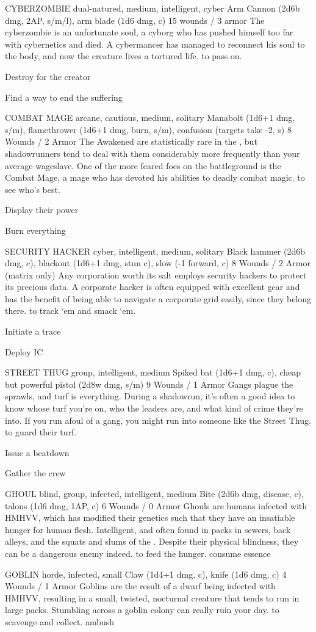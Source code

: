 \documentclass[oneside,10pt]{article}
\begin{document}
\begin{multicols}{2}
\critterspec
{CYBERZOMBIE	}
{dual-natured, medium, intelligent, cyber}
{Arm Cannon (2d6b dmg, 2AP, s/m/l), arm blade (1d6 dmg, c)}
{15 wounds / 3 armor}
{The cyberzombie is an unfortunate soul, a cyborg who has pushed himself too far with cybernetics and died. A cybermancer has managed to reconnect his soul to the body, and now the creature lives a tortured life. }
{to pass on.}
{\tcirc{} Destroy for the creator

\tcirc{} Find a way to end the suffering}


\critterspec
{COMBAT MAGE	}
{arcane, cautious, medium, solitary}
{Manabolt (1d6+1 dmg, s/m), flamethrower (1d6+1 dmg, burn, s/m), confusion (targets take -2, s)}
{8 Wounds / 2 Armor}
{The Awakened are statistically rare in the \SW{}, but shadowrunners tend to deal with them considerably more frequently than your average wageslave. One of the more feared foes on the battleground is the Combat Mage, a mage who has devoted his abilities to deadly combat magic.} 
{to see who’s best.}
{\tcirc{} Display their power

\tcirc{} Burn everything}

\critterspec
{SECURITY HACKER	}
{cyber, intelligent, medium, solitary}
{Black hammer (2d6b dmg, c), blackout (1d6+1 dmg, stun c), slow (-1 forward, c)}
{8 Wounds / 2 Armor (matrix only)}
{Any corporation worth its salt employs security hackers to protect its precious data. A corporate hacker is often equipped with excellent gear and has the benefit of being able to navigate a corporate grid easily, since they belong there.}
{to track ‘em and smack ‘em.}
{\tcirc{} Initiate a trace

\tcirc{} Deploy IC}

\critterspec
{STREET THUG}
{group, intelligent, medium}
{Spiked bat (1d6+1 dmg, c), cheap but powerful pistol (2d8w dmg, s/m)}
{9 Wounds / 1 Armor}
{Gangs plague the sprawls, and turf is everything. During a shadowrun, it’s often a good idea to know whose turf you’re on, who the leaders are, and what kind of crime they’re into. If you run afoul of a gang, you might run into someone like the Street Thug.}
{to guard their turf.}
{\tcirc{} Issue a beatdown

\tcirc{} Gather the crew
}

\critterspec
{GHOUL}
{blind, group, infected, intelligent, medium}
{Bite (2d6b dmg, disease, c), talons (1d6 dmg, 1AP, c)}
{6 Wounds / 0 Armor}
{Ghouls are humans infected with HMHVV, which has modified their genetics such that they have an insatiable hunger for human flesh. Intelligent, and often found in packs in sewers, back alleys, and the squats and slums of the \SW{}. Despite their physical blindness, they can be a dangerous enemy indeed.}
{to feed the hunger.}
{\tcirc{} consume essence}

\critterspec
{GOBLIN	}
{horde, infected, small}
{Claw (1d4+1 dmg, c), knife (1d6 dmg, c)}
{4 Wounds / 1 Armor}
{Goblins are the result of a dwarf being infected with HMHVV, resulting in a small, twisted, nocturnal creature that tends to run in large packs. Stumbling across a goblin colony can really ruin your day.}
{to scavenge and collect.}
{\tcirc{} ambush}

\end{multicols}
\end{document}
